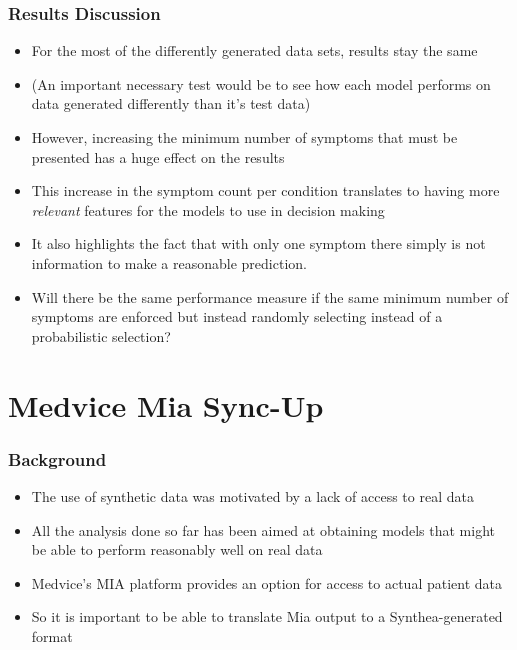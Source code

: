 \documentclass{beamer}
\begin{document}
\begin{frame}
\frametitle{Results Discussion }
\begin{itemize}
	\item For the most of the differently generated data sets, results stay the same
	\item (An important necessary test would be to see how each model performs on data generated differently than it's test data)
	\item However, increasing the minimum number of symptoms that must be presented has a huge effect on the results
	\item This increase in the symptom count per condition translates to having more \textit{relevant} features for the models to use in decision making
	\item It also highlights the fact that with only one symptom there simply is not information to make a reasonable prediction.
	\item Will there be the same performance measure if the same minimum number of symptoms are enforced but instead randomly selecting instead of a probabilistic selection?
\end{itemize}
\end{frame}

\section{Medvice Mia Sync-Up}
\frametitle{Background }
\begin{frame}
\begin{itemize}
	\item The use of synthetic data was motivated by a lack of access to real data
	\item All the analysis done so far has been aimed at obtaining models that might be able to perform reasonably well on real data
	\item Medvice's MIA platform provides an option for access to actual patient data
	\item So it is important to be able to translate Mia output to a Synthea-generated format
\end{itemize}
\end{frame}
\end{document}
